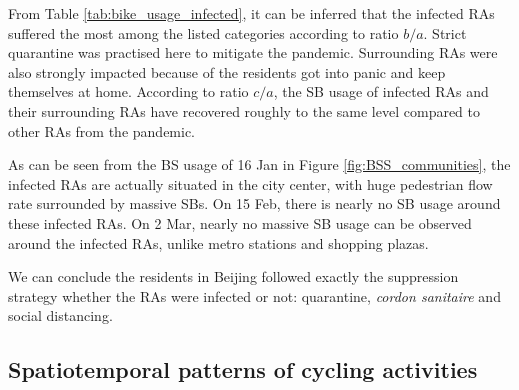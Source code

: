 \documentclass[preprints,ijgi,submit,moreauthors]{Definitions/mdpi}
\begin{document}
From Table \ref{tab:bike_usage_infected}, it can be inferred that the infected RAs suffered the most among the listed categories according to ratio $b/a$.
Strict quarantine was practised here to mitigate the pandemic.
Surrounding RAs were also strongly impacted because of the residents got into panic and keep themselves at home.
According to ratio $c/a$, the SB usage of infected RAs and their surrounding RAs have recovered roughly to the same level compared to other RAs from the pandemic.

As can be seen from the BS usage of 16 Jan in Figure \ref{fig:BSS_communities}, the infected RAs are actually situated in the city center, with huge pedestrian flow rate surrounded by massive SBs.
On 15 Feb, there is nearly no SB usage around these infected RAs.
On 2 Mar, nearly no massive SB usage can be observed around the infected RAs, unlike metro stations and shopping plazas.

We can conclude the residents in Beijing followed exactly the suppression strategy whether the RAs were infected or not: quarantine, \textit{cordon sanitaire} and social distancing.

\subsection{Spatiotemporal patterns of cycling activities}
\end{document}

